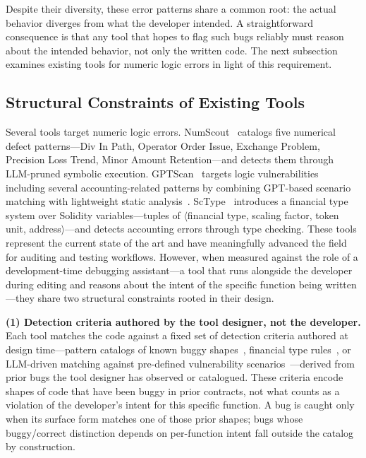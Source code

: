 \documentclass[pdflatex,sn-basic]{sn-jnl}%
\theoremstyle{thmstyleone}%
\theoremstyle{thmstyletwo}%
\theoremstyle{thmstylethree}%
\begin{document}
Despite their diversity, these error patterns share a common root: the actual behavior diverges from what the developer intended.
A straightforward consequence is that any tool that hopes to flag such bugs reliably must reason about the intended behavior, not only the written code.
The next subsection examines existing tools for numeric logic errors in light of this requirement.

\subsection{Structural Constraints of Existing Tools}

Several tools target numeric logic errors.
NumScout~\citep{numscout} catalogs five numerical defect patterns---Div In Path, Operator Order Issue, Exchange Problem, Precision Loss Trend, Minor Amount Retention---and detects them through LLM-pruned symbolic execution.
GPTScan~\citep{gptscan} targets logic vulnerabilities including several accounting-related patterns by combining GPT-based scenario matching with lightweight static analysis~\citep{slither}.
ScType~\citep{sctype} introduces a financial type system over Solidity variables---tuples of $\langle$financial type, scaling factor, token unit, address$\rangle$---and detects accounting errors through type checking.
These tools represent the current state of the art and have meaningfully advanced the field for auditing and testing workflows.
However, when measured against the role of a development-time debugging assistant---a tool that runs alongside the developer during editing and reasons about the intent of the specific function being written---they share two structural constraints rooted in their design.

\smallskip
\noindent\textbf{(1) Detection criteria authored by the tool designer, not the developer.}
Each tool matches the code against a fixed set of detection criteria authored at design time---pattern catalogs of known buggy shapes~\citep{numscout}, financial type rules~\citep{sctype}, or LLM-driven matching against pre-defined vulnerability scenarios~\citep{gptscan}---derived from prior bugs the tool designer has observed or catalogued.
These criteria encode shapes of code that have been buggy in prior contracts, not what counts as a violation of the developer's intent for this specific function. A bug is caught only when its surface form matches one of those prior shapes; bugs whose buggy/correct distinction depends on per-function intent fall outside the catalog by construction.
\end{document}
